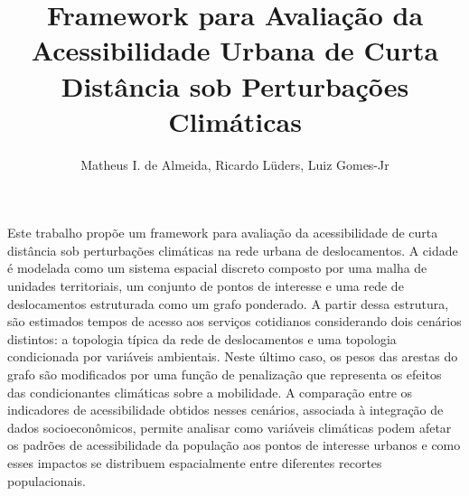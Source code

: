 \documentclass[12pt]{article}
\title{Framework para Avaliação da Acessibilidade Urbana de Curta Distância sob Perturbações Climáticas}
\author{Matheus I. de Almeida\inst{1}, Ricardo Lüders\inst{1}, Luiz Gomes-Jr\inst{1}}
\begin{document}
 

\maketitle

     
\begin{resumo}
Este trabalho propõe um framework para avaliação da acessibilidade de curta distância sob perturbações climáticas na rede urbana de deslocamentos. A cidade é modelada como um sistema espacial discreto composto por uma malha de unidades territoriais, um conjunto de pontos de interesse e uma rede de deslocamentos estruturada como um grafo ponderado. A partir dessa estrutura, são estimados tempos de acesso aos serviços cotidianos considerando dois cenários distintos: a topologia típica da rede de deslocamentos e uma topologia condicionada por variáveis ambientais. Neste último caso, os pesos das arestas do grafo são modificados por uma função de penalização que representa os efeitos das condicionantes climáticas sobre a mobilidade. A comparação entre os indicadores de acessibilidade obtidos nesses cenários, associada à integração de dados socioeconômicos, permite analisar como variáveis climáticas podem afetar os padrões de acessibilidade da população aos pontos de interesse urbanos e como esses impactos se distribuem espacialmente entre diferentes recortes populacionais.
\end{resumo}

% 
% 
% 
% 
% 










\newpage

\end{document}
